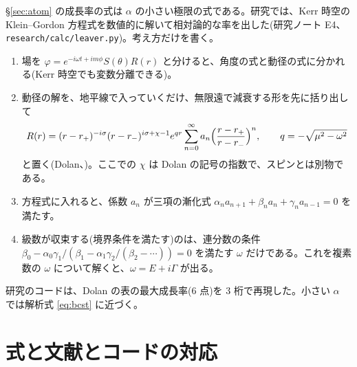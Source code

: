 \S\ref{sec:atom} の成長率の式は $\alpha$ の小さい極限の式である。研究では、Kerr 時空の Klein--Gordon 方程式を数値的に解いて相対論的な率を出した(研究ノート E4、\texttt{research/calc/leaver.py})。考え方だけを書く。
\begin{enumerate}
\item 場を $\varphi=e^{-i\omega t+im\phi}S(\theta)R(r)$ と分けると、角度の式と動径の式に分かれる(Kerr 時空でも変数分離できる)。
\item 動径の解を、地平線で入っていくだけ、無限遠で減衰する形を先に括り出して
\[
R(r)=(r-r_+)^{-i\sigma}(r-r_-)^{i\sigma+\chi-1}e^{qr}\sum_{n=0}^\infty a_n\Bigl(\frac{r-r_+}{r-r_-}\Bigr)^n,\qquad q=-\sqrt{\mu^2-\omega^2}
\]
と置く(Dolan、)。ここでの $\chi$ は Dolan の記号の指数で、スピンとは別物である。
\item 方程式に入れると、係数 $a_n$ が三項の漸化式 $\alpha_na_{n+1}+\beta_na_n+\gamma_na_{n-1}=0$ を満たす。
\item 級数が収束する(境界条件を満たす)のは、連分数の条件 $\beta_0-\alpha_0\gamma_1/(\beta_1-\alpha_1\gamma_2/(\beta_2-\cdots))=0$ を満たす $\omega$ だけである。これを複素数の $\omega$ について解くと、$\omega=E+i\Gamma$ が出る。
\end{enumerate}
研究のコードは、Dolan の表の最大成長率(6 点)を 3 桁で再現した。小さい $\alpha$ では解析式 \eqref{eq:bcst} に近づく。

\section{式と文献とコードの対応}\label{app:map}

